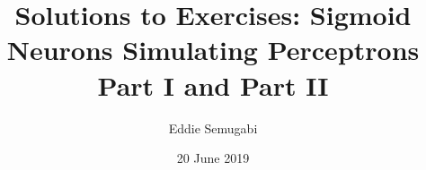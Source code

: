 \documentclass[a4paper,12pt]{article}
\begin{document}
\title{Solutions to  Exercises: Sigmoid Neurons 
Simulating Perceptrons Part I and Part II}
\author{Eddie Semugabi}
\date{20 June 2019}
\maketitle
\end{document}
